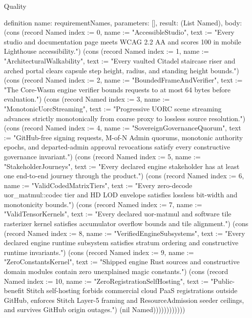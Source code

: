 \begin{lexlean}{Quality}
\begin{semanticmodule}
definition{
  name: requirementNames,
  parameters: [],
  result: (List Named),
  body: (cons (record Named {index := 0, name := "AccessibleStudio", text := "Every studio and documentation page meets WCAG 2.2 AA and scores 100 in mobile Lighthouse accessibility."}) (cons (record Named {index := 1, name := "ArchitecturalWalkability", text := "Every vaulted Citadel staircase riser and arched portal clears capsule step height, radius, and standing height bounds."}) (cons (record Named {index := 2, name := "BoundedFrameAndVerifier", text := "The Core-Wasm engine verifier bounds requests to at most 64 bytes before evaluation."}) (cons (record Named {index := 3, name := "MonotonicUorcStreaming", text := "Progressive UORC scene streaming advances strictly monotonically from coarse proxy to lossless source resolution."}) (cons (record Named {index := 4, name := "SovereignGovernanceQuorum", text := "GitHub-free signing requests, M-of-N Admin quorums, monotonic authority epochs, and departed-admin approval revocations satisfy every constructive governance invariant."}) (cons (record Named {index := 5, name := "StakeholderJourneys", text := "Every declared engine stakeholder has at least one end-to-end journey through the product."}) (cons (record Named {index := 6, name := "ValidCodedMatrixTiers", text := "Every zero-decode uor_matmul::codec tier and HD LOD envelope satisfies lossless bit-width and monotonicity bounds."}) (cons (record Named {index := 7, name := "ValidTensorKernels", text := "Every declared uor-matmul and software tile rasterizer kernel satisfies accumulator overflow bounds and tile alignment."}) (cons (record Named {index := 8, name := "VerifiedEngineSubsystems", text := "Every declared engine runtime subsystem satisfies stratum ordering and constructive runtime invariants."}) (cons (record Named {index := 9, name := "ZeroConstantsKernel", text := "Shipped engine Rust sources and constructive domain modules contain zero unexplained magic constants."}) (cons (record Named {index := 10, name := "ZeroRegistrationSelfHosting", text := "Public-benefit Stitch self-hosting forbids commercial cloud PaaS registrations outside GitHub, enforces Stitch Layer-5 framing and ResourceAdmission seeder ceilings, and survives GitHub origin outages."}) (nil Named))))))))))))
}


\end{semanticmodule}
\end{lexlean}
